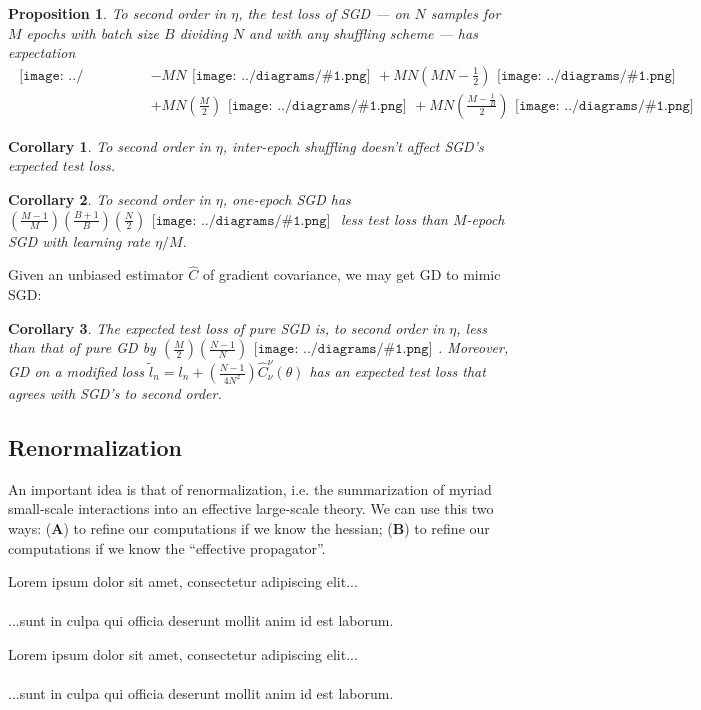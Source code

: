 \documentclass{article}
\newtheorem{cor}{Corollary}
\newtheorem{prop}{Proposition}
\newcommand{\wrap}[1]{\left( #1 \right)}
\newcommand{\dia} [1]{\begin{gathered}\texttt{[image: ../diagrams/\#1.png]}\end{gathered}}
\newcommand{\mdia}[1]{\begin{gathered}\texttt{[image: ../diagrams/\#1.png]}\end{gathered}}
\newcommand{\sdia}[1]{\begin{gathered}\texttt{[image: ../diagrams/\#1.png]}\end{gathered}}
\newcommand{\lorem}[1]{
    Lorem ipsum dolor sit amet, consectetur adipiscing elit...\\
    \nopagebreak\vspace{#1cm} \ \\
    ...sunt in culpa qui officia deserunt mollit anim id est laborum.
}
\begin{document}
    \begin{prop}
        To second order in $\eta$, the test loss of SGD --- on $N$
        samples for $M$ epochs with batch size $B$ dividing $N$ and with any
        shuffling scheme --- has expectation
        {\small
        \begin{align*}
                                                    \dia{(0)()}
            &- MN                                   \dia{(0-1)(01)}
             + MN\wrap{MN - \frac{1}{2}}            \dia{(0-1-2)(01-12)} \\
            &+ MN\wrap{\frac{M}{2}}                 \dia{c(01-2)(02-12)}  
             + MN\wrap{\frac{M-\frac{1}{B}}{2}}     \dia{c(01-2)(01-12)}
        \end{align*}
        }
    \end{prop}

    \begin{cor}
        To second order in $\eta$, inter-epoch shuffling doesn't affect SGD's
        expected test loss.
    \end{cor}

    \begin{cor}
        To second order in $\eta$, one-epoch SGD has 
        $
             \wrap{\frac{M-1}{M}}\wrap{\frac{B+1}{B}}\wrap{\frac{N}{2}} \mdia{c(01-2)(01-12)}
        $
        less test loss than $M$-epoch SGD with learning rate $\eta/M$. 
    \end{cor}

    Given an unbiased estimator $\hat{C}$ of gradient covariance, we may get
    GD to mimic SGD:
    \begin{cor}
        The expected test loss of pure SGD is, to second order in $\eta$,
        less than that of pure GD by
        $
              \wrap{\frac{M}{2}} \wrap{\frac{N-1}{N}} \sdia{c(01-2)(01-12)}
        $.
        Moreover, GD on a modified loss 
        $
            \tilde l_n = l_n + \wrap{\frac{N-1}{4N^2}} \hat{C}_\nu^\nu(\theta)
        $
        has an expected test loss that agrees with SGD's to second order.
    \end{cor}

\subsection{Renormalization}
    An important idea is that of renormalization, i.e. the summarization of  
    myriad small-scale interactions into an effective large-scale theory. 
    We can use this two ways:
        ({\bf A}) to refine our computations if we know the hessian;  
        ({\bf B}) to refine our computations if we know the ``effective propagator''.
    \lorem{3}
    \lorem{3}
\end{document}
